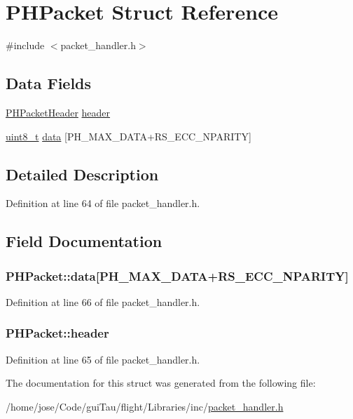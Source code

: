 \hypertarget{struct_p_h_packet}{\section{P\-H\-Packet Struct Reference}
\label{struct_p_h_packet}
}


{\ttfamily \#include $<$packet\-\_\-handler.\-h$>$}

\subsection*{Data Fields}
\begin{DoxyCompactItemize}
\item 
\hyperlink{struct_p_h_packet_header}{P\-H\-Packet\-Header} \hyperlink{struct_p_h_packet_a930af3e24c9d3aa4a29fa0e72b62f12b}{header}
\item 
\hyperlink{stdint_8h_aba7bc1797add20fe3efdf37ced1182c5}{uint8\-\_\-t} \hyperlink{struct_p_h_packet_ab75944547b63cd1feaaa0727b7505c52}{data} \mbox{[}P\-H\-\_\-\-M\-A\-X\-\_\-\-D\-A\-T\-A+R\-S\-\_\-\-E\-C\-C\-\_\-\-N\-P\-A\-R\-I\-T\-Y\mbox{]}
\end{DoxyCompactItemize}


\subsection{Detailed Description}


Definition at line 64 of file packet\-\_\-handler.\-h.



\subsection{Field Documentation}
\hypertarget{struct_p_h_packet_ab75944547b63cd1feaaa0727b7505c52}{
\subsubsection[{data}]{ P\-H\-Packet\-::data\mbox{[}P\-H\-\_\-\-M\-A\-X\-\_\-\-D\-A\-T\-A+R\-S\-\_\-\-E\-C\-C\-\_\-\-N\-P\-A\-R\-I\-T\-Y\mbox{]}}}\label{struct_p_h_packet_ab75944547b63cd1feaaa0727b7505c52}


Definition at line 66 of file packet\-\_\-handler.\-h.

\hypertarget{struct_p_h_packet_a930af3e24c9d3aa4a29fa0e72b62f12b}{
\subsubsection[{header}]{ P\-H\-Packet\-::header}}\label{struct_p_h_packet_a930af3e24c9d3aa4a29fa0e72b62f12b}


Definition at line 65 of file packet\-\_\-handler.\-h.



The documentation for this struct was generated from the following file\-:\begin{DoxyCompactItemize}
\item 
/home/jose/\-Code/gui\-Tau/flight/\-Libraries/inc/\hyperlink{packet__handler_8h}{packet\-\_\-handler.\-h}\end{DoxyCompactItemize}
